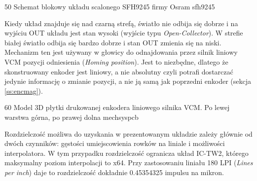	{50}
	{Schemat blokowy układu scalonego SFH9245 firmy Osram}
	{sfh9245}

Kiedy układ znajduje się nad czarną strefą, światło nie odbija się dobrze i na wyjściu OUT układu jest stan wysoki (wyjście typu {\it Open-Collector}). W strefie białej światło odbija się bardzo dobrze i stan OUT zmienia się na niski. Mechanizm ten jest używany w głowicy do odnajdowania przez silnik liniowy VCM pozycji odniesienia ({\it Homing position}). Jest to niezbędne, dlatego że skonstruowany enkoder jest liniowy, a nie absolutny czyli potrafi dostarczać jedynie informację o zmianie pozycji, a nie ją samą jak poprzedni enkoder (sekcja \ref{ss:encmag}).

	{60}
	{Model 3D płytki drukowanej enkodera liniowego silnika VCM. Po lewej warstwa górna, po prawej dolna}
	{mechsyspcb}

Rozdzielczość możliwa do uzyskania w prezentowanym układzie zależy głównie od dwóch czynników: gęstości umiejscowienia rowków na liniale i możliwości interpolatora. W tym przypadku rozdzielczość ogranicza układ IC-TW2, którego maksymalny poziom interpolacji to x64. Przy zastosowaniu liniału 180 LPI ({\it Lines per inch}) daje to rozdzielczość dokładnie 0.45354325 impulsu na mikron.





\clearpage















